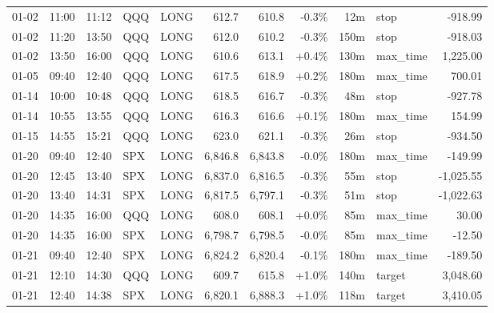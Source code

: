 \documentclass[11pt,a4paper,twoside]{article}
\begin{document}
\begin{center}
\begin{longtable}{>{\color{txtmain}}l l l l l r r r r >{\color{txtmain}}l r}
01-02 & 11:00 & 11:12 & QQQ & LONG & 612.7 & 610.8 & \textcolor{lossred}{-0.3\%} & 12m & stop & \textcolor{lossred}{-918.99} \\
01-02 & 11:20 & 13:50 & QQQ & LONG & 612.0 & 610.2 & \textcolor{lossred}{-0.3\%} & 150m & stop & \textcolor{lossred}{-918.03} \\
01-02 & 13:50 & 16:00 & QQQ & LONG & 610.6 & 613.1 & \textcolor{wingreen}{+0.4\%} & 130m & max\_time & \textcolor{wingreen}{1,225.00} \\
01-05 & 09:40 & 12:40 & QQQ & LONG & 617.5 & 618.9 & \textcolor{wingreen}{+0.2\%} & 180m & max\_time & \textcolor{wingreen}{700.01} \\
01-14 & 10:00 & 10:48 & QQQ & LONG & 618.5 & 616.7 & \textcolor{lossred}{-0.3\%} & 48m & stop & \textcolor{lossred}{-927.78} \\
01-14 & 10:55 & 13:55 & QQQ & LONG & 616.3 & 616.6 & \textcolor{wingreen}{+0.1\%} & 180m & max\_time & \textcolor{wingreen}{154.99} \\
01-15 & 14:55 & 15:21 & QQQ & LONG & 623.0 & 621.1 & \textcolor{lossred}{-0.3\%} & 26m & stop & \textcolor{lossred}{-934.50} \\
01-20 & 09:40 & 12:40 & SPX & LONG & 6,846.8 & 6,843.8 & \textcolor{lossred}{-0.0\%} & 180m & max\_time & \textcolor{lossred}{-149.99} \\
01-20 & 12:45 & 13:40 & SPX & LONG & 6,837.0 & 6,816.5 & \textcolor{lossred}{-0.3\%} & 55m & stop & \textcolor{lossred}{-1,025.55} \\
01-20 & 13:40 & 14:31 & SPX & LONG & 6,817.5 & 6,797.1 & \textcolor{lossred}{-0.3\%} & 51m & stop & \textcolor{lossred}{-1,022.63} \\
01-20 & 14:35 & 16:00 & QQQ & LONG & 608.0 & 608.1 & \textcolor{wingreen}{+0.0\%} & 85m & max\_time & \textcolor{wingreen}{30.00} \\
01-20 & 14:35 & 16:00 & SPX & LONG & 6,798.7 & 6,798.5 & \textcolor{lossred}{-0.0\%} & 85m & max\_time & \textcolor{lossred}{-12.50} \\
01-21 & 09:40 & 12:40 & SPX & LONG & 6,824.2 & 6,820.4 & \textcolor{lossred}{-0.1\%} & 180m & max\_time & \textcolor{lossred}{-189.50} \\
01-21 & 12:10 & 14:30 & QQQ & LONG & 609.7 & 615.8 & \textcolor{wingreen}{+1.0\%} & 140m & target & \textcolor{wingreen}{3,048.60} \\
01-21 & 12:40 & 14:38 & SPX & LONG & 6,820.1 & 6,888.3 & \textcolor{wingreen}{+1.0\%} & 118m & target & \textcolor{wingreen}{3,410.05} \\

\end{longtable}
\end{center}
\end{document}
